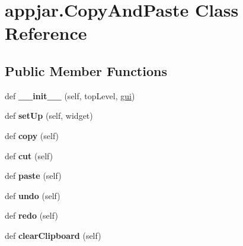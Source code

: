 \hypertarget{classappjar_1_1_copy_and_paste}{}\section{appjar.\+Copy\+And\+Paste Class Reference}
\label{classappjar_1_1_copy_and_paste}
\subsection*{Public Member Functions}
\begin{DoxyCompactItemize}
\item 
\mbox{\label{classappjar_1_1_copy_and_paste_a0ee2c6d7b287d3c6254dce17159bf22a}} 
def {\bfseries \+\_\+\+\_\+init\+\_\+\+\_\+} (self, top\+Level, \hyperlink{classappjar_1_1gui}{gui})
\item 
\mbox{\label{classappjar_1_1_copy_and_paste_adf4d58db1f87f7a29acd4f99ad2f01a9}} 
def {\bfseries set\+Up} (self, widget)
\item 
\mbox{\label{classappjar_1_1_copy_and_paste_a71b4bee9e8a52d13fe684c63671a4053}} 
def {\bfseries copy} (self)
\item 
\mbox{\label{classappjar_1_1_copy_and_paste_ad458e014884f0c086d4e629d00a62f81}} 
def {\bfseries cut} (self)
\item 
\mbox{\label{classappjar_1_1_copy_and_paste_a016a596a23b91d9ba7005550cf4da561}} 
def {\bfseries paste} (self)
\item 
\mbox{\label{classappjar_1_1_copy_and_paste_a39d34a00f1abc51aa40890c09d73a3a3}} 
def {\bfseries undo} (self)
\item 
\mbox{\label{classappjar_1_1_copy_and_paste_a8ce2797e89dc1d732450ad37fff4a50f}} 
def {\bfseries redo} (self)
\item 
\mbox{\label{classappjar_1_1_copy_and_paste_a4ca700b3551617a1c97b18e592121f0c}} 
def {\bfseries clear\+Clipboard} (self)
\item 

\end{DoxyCompactItemize}
